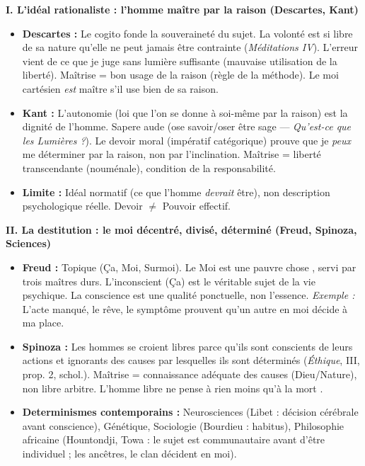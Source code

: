 \documentclass[11pt]{article}
\newcommand{\cle}[1]{{\popxbold\color{popdark}#1}}
\begin{document}
\begin{corrige}
\textbf{I. L'idéal rationaliste : l'homme maître par la raison (Descartes, Kant)}
\begin{itemize}
\item \textbf{Descartes :} Le \cle{cogito} fonde la souveraineté du sujet. \guillemotleft La volonté est si libre de sa nature qu'elle ne peut jamais être contrainte \guillemotright (\emph{Méditations IV}). L'erreur vient de ce que je juge sans lumière suffisante (mauvaise utilisation de la liberté). Maîtrise = \cle{bon usage de la raison} (règle de la méthode). Le moi cartésien \emph{est} maître s'il use bien de sa raison.
\item \textbf{Kant :} L'\cle{autonomie} (loi que l'on se donne à soi-même par la raison) est la dignité de l'homme. \guillemotleft Sapere aude \guillemotright (ose savoir/oser être sage — \emph{Qu'est-ce que les Lumières ?}). Le devoir moral (\cle{impératif catégorique}) prouve que je \emph{peux} me déterminer par la raison, non par l'inclination. Maîtrise = \cle{liberté transcendante} (nouménale), condition de la responsabilité.
\item \textbf{Limite :} Idéal normatif (ce que l'homme \emph{devrait} être), non description psychologique réelle. \guillemotleft Devoir \guillemotright $\neq$ \guillemotleft Pouvoir \guillemotright effectif.
\end{itemize}

\textbf{II. La destitution : le moi décentré, divisé, déterminé (Freud, Spinoza, Sciences)}
\begin{itemize}
\item \textbf{Freud :} Topique (Ça, Moi, Surmoi). Le Moi est \guillemotleft une pauvre chose \guillemotright, servi par trois maîtres durs. L'\cle{inconscient} (Ça) est le véritable sujet de la vie psychique. La conscience est une \cle{qualité} ponctuelle, non l'essence. \textit{Exemple :} L'acte manqué, le rêve, le symptôme prouvent qu'un \guillemotleft autre \guillemotright en moi décide à ma place.
\item \textbf{Spinoza :} \guillemotleft Les hommes se croient libres parce qu'ils sont conscients de leurs actions et ignorants des causes par lesquelles ils sont déterminés \guillemotright (\emph{Éthique}, III, prop. 2, schol.). Maîtrise = \cle{connaissance adéquate} des causes (Dieu/Nature), non libre arbitre. \guillemotleft L'homme libre ne pense à rien moins qu'à la mort \guillemotright.
\item \textbf{Determinismes contemporains :} Neurosciences (Libet : décision cérébrale avant conscience), Génétique, Sociologie (Bourdieu : habitus), Philosophie africaine (Hountondji, Towa : le sujet est \guillemotleft communautaire \guillemotright avant d'être individuel ; les ancêtres, le clan décident en moi).
\end{itemize}


\end{corrige}
\end{document}
